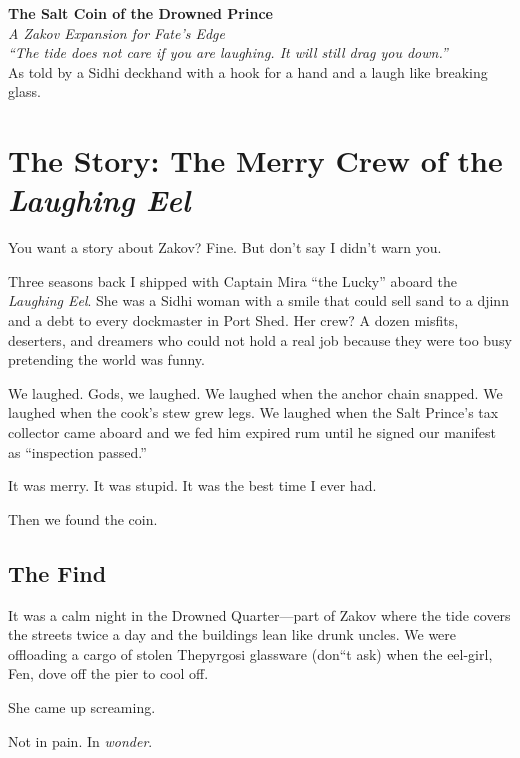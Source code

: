 \documentclass[12pt]{article}
\begin{document}


\begin{center}
    {\LARGE\bfseries The Salt Coin of the Drowned Prince}\\[4pt]
    {\large\itshape A Zakov Expansion for Fate's Edge}\\[12pt]
    \textit{``The tide does not care if you are laughing. It will still drag you down.''}\\[24pt]
    {\large As told by a Sidhi deckhand with a hook for a hand and a laugh like breaking glass.}
\end{center}
\vspace{1em}

\section*{The Story: The Merry Crew of the \textit{Laughing Eel}}

You want a story about Zakov? Fine. But don't say I didn't warn you.

Three seasons back I shipped with Captain Mira ``the Lucky'' aboard the \textit{Laughing Eel}. She was a Sidhi woman with a smile that could sell sand to a djinn and a debt to every dockmaster in Port Shed. Her crew? A dozen misfits, deserters, and dreamers who could not hold a real job because they were too busy pretending the world was funny.

We laughed. Gods, we laughed. We laughed when the anchor chain snapped. We laughed when the cook's stew grew legs. We laughed when the Salt Prince's tax collector came aboard and we fed him expired rum until he signed our manifest as ``inspection passed.'' 

It was merry. It was stupid. It was the best time I ever had.

Then we found the coin.

\subsection*{The Find}
It was a calm night in the Drowned Quarter---part of Zakov where the tide covers the streets twice a day and the buildings lean like drunk uncles. We were offloading a cargo of stolen Thepyrgosi glassware (don``t ask) when the eel-girl, Fen, dove off the pier to cool off.

She came up screaming.

Not in pain. In \textit{wonder}.
\end{document}
